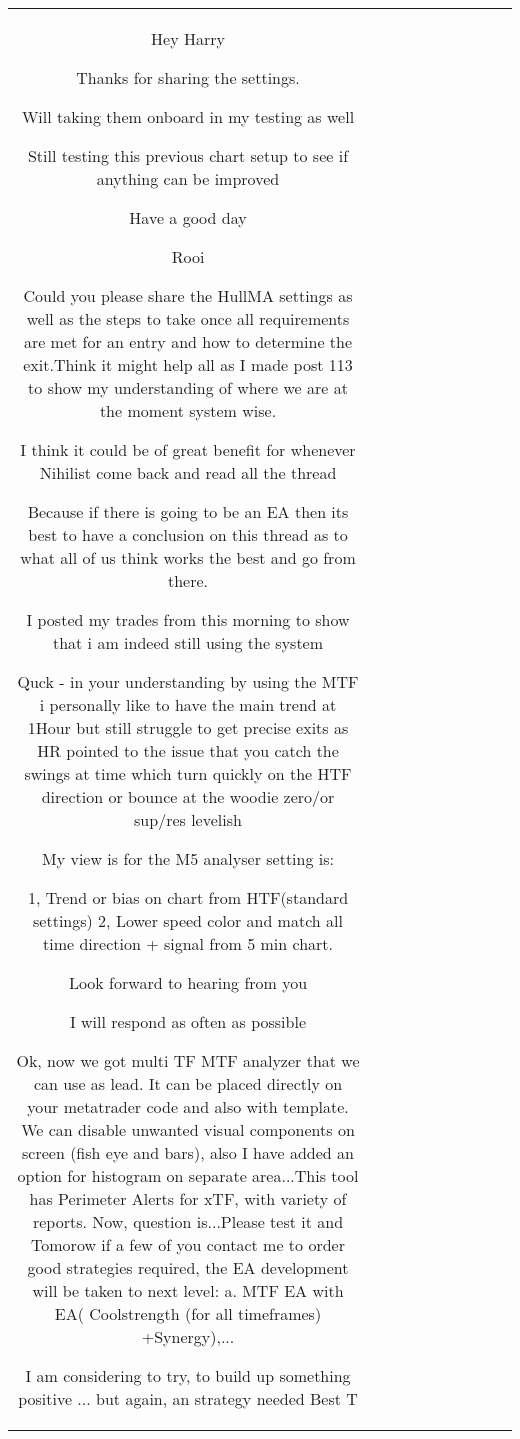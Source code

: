 \begin{table}[h!]
\begin{tabular}{|c|c|c|c|c|c|c|c|c|c|}
Hey Harry

Thanks for sharing the settings.

Will taking them onboard in my testing as well

Still testing this previous chart setup to see if anything can be improved

Have a good day


Rooi

Could you please share the HullMA settings as well as the steps to take once all requirements are met for an entry and how to determine the exit.Think it might help all as I made post 113 to show my understanding of where we are at the moment system wise.

I think it could be of great benefit for whenever Nihilist come back and read all the thread

Because if there is going to be an EA then its best to have a conclusion on this thread as to what all of us think works the best and go from there.

I posted my trades from this morning to show that i am indeed still using the system

Quck - in your understanding by using the MTF i personally like to have the main trend at 1Hour but still struggle to get precise exits as HR pointed to the issue that you catch the swings at time which turn quickly on the HTF direction or bounce at the woodie zero/or sup/res levelish

My view is for the M5 analyser setting is:

1, Trend or bias on chart from HTF(standard settings)
2, Lower speed color and match all time direction + signal from 5 min chart.

Look forward to hearing from you

I will respond as often as possible

Ok, now we got multi TF MTF analyzer that we can use as lead. It can be placed directly on your metatrader code and also with template. We can disable unwanted visual components on screen (fish eye and bars), also I have added an option for histogram on separate area...This tool has Perimeter Alerts for xTF, with variety of reports. Now, question is...Please test it and Tomorow if a few of you contact me to order good strategies required, the EA development will be taken to next level: a. MTF EA with EA( Coolstrength (for all timeframes) +Synergy),...

I am considering to try, to build up something positive ... but again, an strategy needed  Best
T


\end{tabular}
\end{table}
